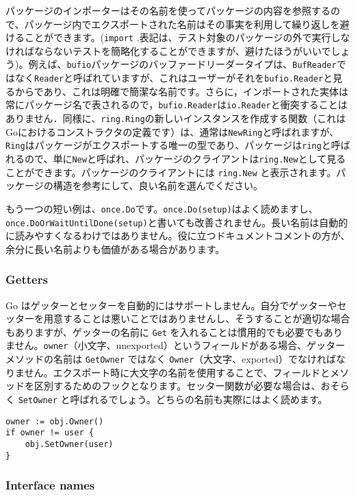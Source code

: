 \documentclass{jsarticle}
\begin{document}
パッケージのインポーターはその名前を使ってパッケージの内容を参照するので、パッケージ内でエクスポートされた名前はその事実を利用して繰り返しを避けることができます。(\texttt{import}
.表記は、テスト対象のパッケージの外で実行しなければならないテストを簡略化することができますが、避けたほうがいいでしょう)。例えば、\texttt{bufio}パッケージのバッファードリーダータイプは、\texttt{BufReader}ではなく\texttt{Reader}と呼ばれていますが、これはユーザーがそれを\texttt{bufio.Reader}と見るからであり、これは明確で簡潔な名前です。さらに，インポートされた実体は常にパッケージ名で表されるので，\texttt{bufio.Reader}は\texttt{io.Reader}と衝突することはありません．同様に、\texttt{ring.Ring}の新しいインスタンスを作成する関数（これはGoにおけるコンストラクタの定義です）は、通常は\texttt{NewRing}と呼ばれますが、\texttt{Ring}はパッケージがエクスポートする唯一の型であり、パッケージは\texttt{ring}と呼ばれるので、単に\texttt{New}と呼ばれ、パッケージのクライアントは\texttt{ring.New}として見ることができます。パッケージのクライアントには
\texttt{ring.New}
と表示されます。パッケージの構造を参考にして、良い名前を選んでください。

もう一つの短い例は、\texttt{once.Do}です。\texttt{once.Do(setup)}はよく読めますし、\texttt{once.DoOrWaitUntilDone(setup)}と書いても改善されません。長い名前は自動的に読みやすくなるわけではありません。役に立つドキュメントコメントの方が、余分に長い名前よりも価値がある場合があります。

\subsubsection{Getters}

Go
はゲッターとセッターを自動的にはサポートしません。自分でゲッターやセッターを用意することは悪いことではありませんし、そうすることが適切な場合もありますが、ゲッターの名前に
\texttt{Get}
を入れることは慣用的でも必要でもありません。\texttt{owner}（小文字、unexported）というフィールドがある場合、ゲッターメソッドの名前は
\texttt{GetOwner} ではなく
\texttt{Owner}（大文字、exported）でなければなりません。エクスポート時に大文字の名前を使用することで、フィールドとメソッドを区別するためのフックとなります。セッター関数が必要な場合は、おそらく
\texttt{SetOwner}
と呼ばれるでしょう。どちらの名前も実際にはよく読めます。

\begin{lstlisting}[numbers=none]
owner := obj.Owner()
if owner != user {
    obj.SetOwner(user)
}
\end{lstlisting}

\subsubsection{Interface names}
\end{document}
